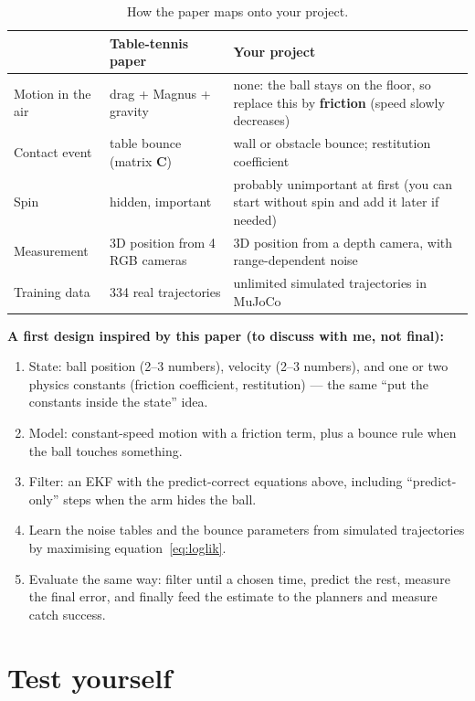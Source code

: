 \documentclass[11pt,a4paper]{article}
\begin{document}
\begin{table}[htbp]
\centering
\small
\renewcommand{\arraystretch}{1.25}
\begin{tabularx}{\textwidth}{@{}p{3.3cm}XX@{}}
\toprule
 & Table-tennis paper & Your project \\
\midrule
Motion in the air & drag + Magnus + gravity & none: the ball stays on the floor, so replace this by \textbf{friction} (speed slowly decreases) \\
Contact event & table bounce (matrix $\mathbf C$) & wall or obstacle bounce; restitution coefficient \\
Spin & hidden, important & probably unimportant at first (you can start without spin and add it later if needed) \\
Measurement & 3D position from 4 RGB cameras & 3D position from a depth camera, with range-dependent noise \\
Training data & 334 real trajectories & unlimited simulated trajectories in MuJoCo \\
\bottomrule
\end{tabularx}
\caption{How the paper maps onto your project.}
\end{table}

\textbf{A first design inspired by this paper (to discuss with me, not final):}
\begin{enumerate}
\item State: ball position (2--3 numbers), velocity (2--3 numbers), and one or two physics constants
(friction coefficient, restitution) --- the same ``put the constants inside the state'' idea.
\item Model: constant-speed motion with a friction term, plus a bounce rule when the ball touches something.
\item Filter: an EKF with the predict-correct equations above, including ``predict-only'' steps when the arm hides the ball.
\item Learn the noise tables and the bounce parameters from simulated trajectories by maximising equation~\eqref{eq:loglik}.
\item Evaluate the same way: filter until a chosen time, predict the rest, measure the final error, and finally feed the estimate to the planners and measure catch success.
\end{enumerate}

\section{Test yourself}
\end{document}
